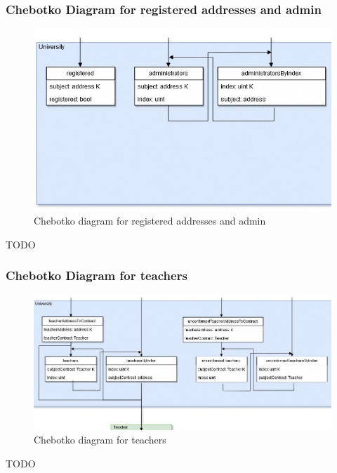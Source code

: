 \documentclass[ManualeSviluppatore]{subfiles}
\begin{document}
\subsubsection{Chebotko Diagram for registered addresses and admin}
\begin{figure}[H]
	\centering
	\includegraphics[width=0.7\linewidth]{"diagrammi/chebotko/registered_and_admin"}
	\caption{Chebotko diagram for registered addresses and admin}
	\label{fig:Chebotko diagram for registered addresses and admin}
\end{figure}
TODO

\subsubsection{Chebotko Diagram for teachers}
\begin{figure}[H]
	\centering
	\includegraphics[width=1\linewidth]{"diagrammi/chebotko/teacher"}
	\caption{Chebotko diagram for teachers}
	\label{fig:Chebotko diagram for teachers}
\end{figure}
TODO
\end{document}
